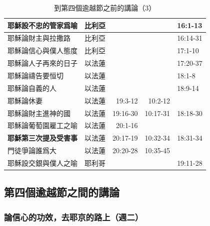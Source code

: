 \begin{table}[htbp]
\begin{tabular}{|p{5.93em}l|p{4.215em}|r|r|p{5.855em}|}
    \multicolumn{2}{|p{12.145em}|}{耶穌設不忠的管家爲喻} & 比利亞   &       &       & 16:1-13 \\
    \midrule
    \multicolumn{2}{|p{12.145em}|}{耶穌論財主與拉撒路} & 比利亞   &       &       & 16:14-31 \\
    \midrule
    \multicolumn{2}{|p{12.145em}|}{耶穌論信心與僕人態度} & 比利亞   &       &       & 17:1-10 \\
    \midrule
    \multicolumn{2}{|p{12.145em}|}{耶穌論人子再來的日子} & 以法蓮   &       &       & 17:20-37 \\
    \midrule
    \multicolumn{2}{|p{12.145em}|}{耶穌論禱告要恒切} & 以法蓮   &       &       & 18:1-8 \\
    \midrule
    \multicolumn{2}{|p{12.145em}|}{耶穌論自義的人} & 以法蓮   &       &       & 18:9-14 \\
    \midrule
    \multicolumn{2}{|p{12.145em}|}{耶穌論休妻} & 以法蓮   & \multicolumn{1}{p{5.215em}|}{19:3-12} & \multicolumn{1}{p{5.07em}|}{10:2-12} & \multicolumn{1}{r|}{} \\
    \midrule
    \multicolumn{2}{|p{12.145em}|}{耶穌論財主進神的國} & 以法蓮   & \multicolumn{1}{p{5.215em}|}{19:16-30} & \multicolumn{1}{p{5.07em}|}{10:17-31} & 18:18-30 \\
    \midrule
    \multicolumn{2}{|p{12.145em}|}{耶穌論葡萄園雇工之喻} & 以法蓮   & \multicolumn{1}{p{5.215em}|}{20:1-16} &       & \multicolumn{1}{r|}{} \\
    \midrule
    \multicolumn{2}{|p{12.145em}|}{\textbf{耶穌第三次提及受害事}} & 以法蓮   & \multicolumn{1}{p{5.215em}|}{20:17-19} & \multicolumn{1}{p{5.07em}|}{10:32-34} & 18:31-34 \\
    \midrule
    \multicolumn{2}{|p{12.145em}|}{門徒爭論誰爲大} & 以法蓮   & \multicolumn{1}{p{5.215em}|}{20:20-28} & \multicolumn{1}{p{5.07em}|}{10:35-45} & \multicolumn{1}{r|}{} \\
    \midrule
    \multicolumn{2}{|p{12.145em}|}{耶穌設交銀與僕人之喻} & 耶利哥   &       &       & 19:11-28 \\
    \bottomrule
    \end{tabular}%
     \caption{到第四個逾越節之前的講論（3）}
  \label{tab:addlabel}%
\end{table}%

\subsection{第四個逾越節之間的講論}
\subsubsection{論信心的功效，去耶京的路上（週二）}

